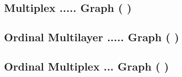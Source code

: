 \documentclass{tufte-handout}
\begin{document}
\clearpage

\subsection{Multiplex ..... Graph ( )}

\clearpage

\subsection{Ordinal Multilayer .....  Graph ( )}

\clearpage

\subsection{Ordinal Multiplex ... Graph ( )}

%
%
\end{document}
